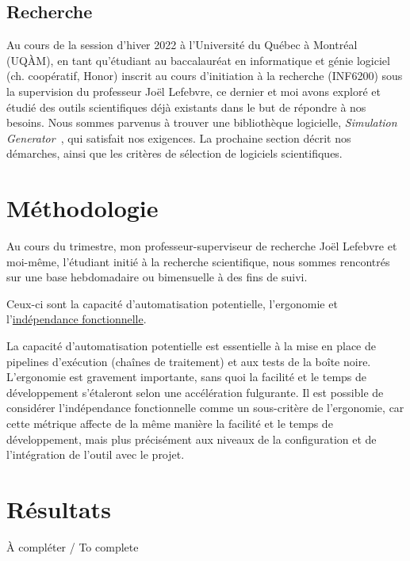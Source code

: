 \documentclass{article}
\begin{document}
  \subsection{Recherche}
  \label{subsec:research}
  Au cours de la session d'hiver 2022 à l'Université du Québec à Montréal (UQÀM), en tant qu'étudiant au baccalauréat en informatique et génie logiciel (ch.
  coopératif, Honor) inscrit au cours d'initiation à la recherche (INF6200) sous la supervision du professeur Joël Lefebvre, ce dernier et moi avons exploré et étudié
  des outils scientifiques déjà existants dans le but de répondre à nos besoins.
  Nous sommes parvenus à trouver une bibliothèque logicielle, \textit{Simulation Generator}~\citep{alexvalcourtcaron2022simulationgenerator}, qui satisfait nos exigences.
  La prochaine section décrit nos démarches, ainsi que les critères de sélection de logiciels scientifiques.


  \section{Méthodologie}
  \label{sec:methodology}
  Au cours du trimestre, mon professeur-superviseur de recherche Joël Lefebvre et moi-même, l'étudiant initié à la recherche scientifique, nous sommes rencontrés sur
  une base hebdomadaire ou bimensuelle à des fins de suivi.


  Ceux-ci sont la capacité d'automatisation potentielle, l'ergonomie et l'\href{https://fr.wikipedia.org/wiki/Ind%C3%A9pendance_fonctionnelle}{indépendance
  fonctionnelle}.

  La capacité d'automatisation potentielle est essentielle à la mise en place de pipelines d'exécution (chaînes de traitement) et aux tests de la boîte noire.
  L'ergonomie est gravement importante, sans quoi la facilité et le temps de développement s'étaleront selon une accélération fulgurante.
  Il est possible de considérer l'indépendance fonctionnelle comme un sous-critère de l'ergonomie, car cette métrique affecte de la même manière la facilité et le
  temps de développement, mais plus précisément aux niveaux de la configuration et de l'intégration de l'outil avec le projet.



  \section{Résultats}
  \label{sec:results}
  À compléter / To complete
\end{document}
